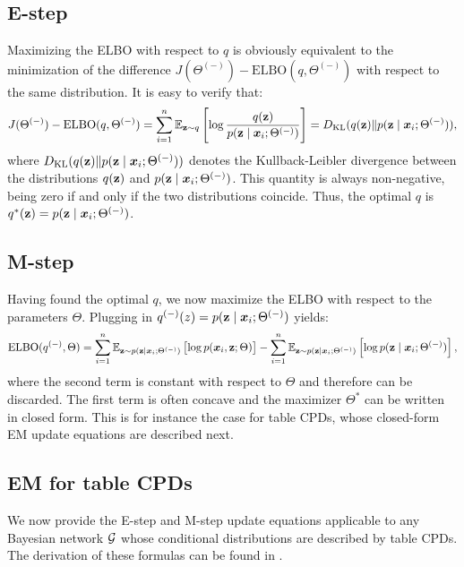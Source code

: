 \subsection{E-step}
\label{sec:e_step}
Maximizing the ELBO with respect to $q$ is obviously equivalent to the minimization of the difference $J(\Theta^{(-)}) - \mathrm{ELBO}(q, \Theta^{(-)})$ with respect to the same distribution. It is easy to verify that:
\begin{equation}
    J(\Theta^{(-)}) - \mathrm{ELBO}(q, \Theta^{(-)}) = \sum_{i=1}^n \mathbb{E}_{{\mathbf{z}} \sim q} \left[ \log \frac{q({\mathbf{z}})}{p({\mathbf{z}} \mid {\bm{x}}_i; \Theta^{(-)})} \right] = D_{\mathrm{KL}}(q({\mathbf{z}}) \Vert p({\mathbf{z}} \mid {\bm{x}}_i; \Theta^{(-)})),
\end{equation}
where $D_{\mathrm{KL}}(q({\mathbf{z}}) \Vert p({\mathbf{z}} \mid {\bm{x}}_i; \Theta^{(-)}))$ denotes the Kullback-Leibler divergence between the distributions $q({\mathbf{z}})$ and $p({\mathbf{z}} \mid {\bm{x}}_i; \Theta^{(-)})$. This quantity is always non-negative, being zero if and only if the two distributions coincide. Thus, the optimal $q$ is $q^*({\mathbf{z}}) = p({\mathbf{z}} \mid {\bm{x}}_i; \Theta^{(-)})$.

\subsection{M-step}
\label{sec:m_step}
Having found the optimal $q$, we now maximize the ELBO with respect to the parameters $\Theta$. Plugging in $q^{(-)}(z) = p({\mathbf{z}} \mid {\bm{x}}_i; \Theta^{(-)})$ yields:
\begin{equation}
    \mathrm{ELBO}(q^{(-)}, \Theta) = \sum_{i=1}^n \mathbb{E}_{{\mathbf{z}} \sim p({\mathbf{z}} \mid {\bm{x}}_i; \Theta^{(-)})} \left[ \log p({\bm{x}}_i, {\mathbf{z}}; \Theta) \right] - \sum_{i=1}^n \mathbb{E}_{{\mathbf{z}} \sim p({\mathbf{z}} \mid {\bm{x}}_i; \Theta^{(-)})} \left[ \log p({\mathbf{z}} \mid {\bm{x}}_i; \Theta^{(-)}) \right],
\end{equation}
where the second term is constant with respect to $\Theta$ and therefore can be discarded. The first term is often concave and the maximizer $\Theta^*$ can be written in closed form. This is for instance the case for table CPDs, whose closed-form EM update equations are described next.

\subsection{EM for table CPDs}
\label{sec:em_table_cpd}
We now provide the E-step and M-step update equations applicable to any Bayesian network ${\mathcal{G}}$ whose conditional distributions are described by table CPDs. The derivation of these formulas can be found in \citet{Koller2009}.

